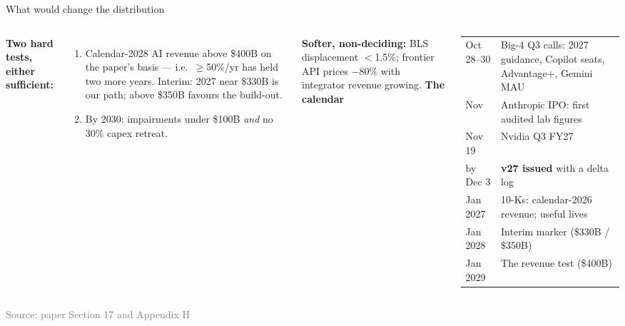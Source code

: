 \documentclass[aspectratio=169,11pt]{beamer}
\newcommand{\src}[1]{\vfill\hfill{\scriptsize\textcolor{gray}{Source: #1}}}
\newcommand{\claim}[1]{\par\vspace{2pt}{\small\textcolor{accent}{#1}}\par}
\begin{document}
\begin{frame}{What would change the distribution}
\claim{The result is a distribution, so the tests are observations that move it decisively.}
\begin{columns}[T]
\small
\textbf{Two hard tests, either sufficient:}
\begin{enumerate}
\item Calendar-2028 AI revenue above \$400B on the paper's basis --- i.e.\ $\ge$50\%/yr has held two more years. Interim: 2027 near \$330B is our path; above \$350B favours the build-out.
\item By 2030: impairments under \$100B \emph{and} no 30\% capex retreat.
\end{enumerate}
\textbf{Softer, non-deciding:} BLS displacement $<$1.5\%; frontier API prices $-$80\% with integrator revenue growing.
\small
\textbf{The calendar}\\[4pt]
\begin{tabular}{ll}\toprule Oct 28--30 & Big-4 Q3 calls: 2027 guidance, Copilot seats, Advantage+, Gemini MAU\\ Nov & Anthropic IPO: first audited lab figures\\ Nov 19 & Nvidia Q3 FY27\\ by Dec 3 & \textbf{v27 issued} with a delta log\\ Jan 2027 & 10-Ks: calendar-2026 revenue; useful lives\\ Jan 2028 & Interim marker (\$330B / \$350B)\\ Jan 2029 & The revenue test (\$400B)\\\bottomrule\end{tabular}
\end{columns}
\src{paper Section 17 and Appendix H}
\end{frame}
\end{document}
